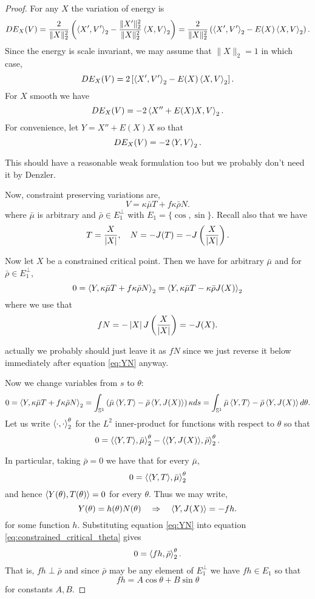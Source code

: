 \documentclass[12pt]{article}
\begin{document}
\begin{proof}
For any \(X\) the variation of energy is
\[
DE_X (V) = \frac{2}{\|X\|_2^2} \left(\left\langle{X'},{V'}\right\rangle_2 - \frac{\|X'\|_2^2}{\|X\|_2^2}\left\langle{X},{V}\right\rangle_2\right) = \frac{2}{\|X\|_2^2} \left(\left\langle{X'},{V'}\right\rangle_2 - E(X) \left\langle{X},{V}\right\rangle_2\right).
\]
Since the energy is scale invariant, we may assume that \(\|X\|_2 = 1\) in which case,
\[
DE_X (V) = 2\left[\left\langle{X'},{V'}\right\rangle_2 - E(X) \left\langle{X},{V}\right\rangle_2\right].
\]
For \(X\) smooth we have
\[
DE_X(V) = -2\left\langle{X'' + E(X) X},{V}\right\rangle_2.
\]
For convenience, let \(Y = X'' + E(X) X\) so that
\[
DE_X(V) = -2\left\langle{Y},{V}\right\rangle_2.
\]

{\color{red} This should have a reasonable weak formulation too but we probably don't need it by Denzler.}

Now, constraint preserving variations are,
\[
V = \kappa \bar{\mu} T + f\kappa\bar{\rho} N.
\]
where \(\bar{\mu}\) is arbitrary and \(\bar{\rho} \in E_1^{\perp}\) with \(E_1 = \{\cos,\sin\}\). Recall also that we have
\[
T = \frac{X}{\left|{X}\right|}, \quad N = -J(T) = -J\left(\frac{X}{\left|{X}\right|}\right).
\]

Now let \(X\) be a constrained critical point. Then we have for arbitrary \(\bar{\mu}\) and for \(\bar{\rho} \in E_1^{\perp}\),
\begin{equation}
\label{eq:constrained_critical}
0 = \left\langle{Y},{\kappa \bar{\mu} T + f\kappa\bar{\rho} N}\right\rangle_2 = \left\langle{Y},{\kappa \bar{\mu} T - \kappa\bar{\rho} J(X)}\right\rangle_2
\end{equation}
where we use that
\[
f N = -\left|{X}\right| J\left(\frac{X}{\left|{X}\right|}\right) = - J(X).
\]

{\color{red}actually we probably should just leave it as \(fN\) since we just reverse it below immediately after equation \eqref{eq:YN} anyway.}

Now we change variables from \(s\) to \(\theta\):
\[
0 = \left\langle{Y},{\kappa \bar{\mu} T + f\kappa\bar{\rho} N}\right\rangle_2 = \int_{\operatorname{\mathbb{S}^1}} \left(\bar{\mu} \left\langle{Y},{T}\right\rangle - \bar{\rho} \left\langle{Y},{J(X)}\right\rangle\right) \kappa ds = \int_{\operatorname{\mathbb{S}^1}} \bar{\mu} \left\langle{Y},{T}\right\rangle - \bar{\rho} \left\langle{Y},{J(X)}\right\rangle d\theta.
\]
Let us write \(\left\langle{\cdot},{\cdot}\right\rangle_2^{\theta}\) for the \(L^2\) inner-product for functions with respect to \(\theta\) so that
\begin{equation}
\label{eq:constrained_critical_theta}
0 = \left\langle{\ensuremath{\left\langle{Y},{T}\right\rangle}},{\bar{\mu}}\right\rangle_2^{\theta} - \left\langle{\ensuremath{\left\langle{Y},{J(X)}\right\rangle}},{\bar{\rho}}\right\rangle_2^{\theta}.
\end{equation}

In particular, taking \(\bar{\rho} = 0\) we have that for every \(\bar{\mu}\),
\[
0 = \left\langle{\ensuremath{\left\langle{Y},{T}\right\rangle}},{\bar{\mu}}\right\rangle_2^{\theta}
\]
and hence \(\left\langle{Y(\theta)},{T(\theta)}\right\rangle = 0\) for every \(\theta\). Thus we may write,
\begin{equation}
\label{eq:YN}
Y(\theta) = h(\theta) N(\theta) \quad \Rightarrow \quad \left\langle{Y},{J(X)}\right\rangle = -fh.
\end{equation}
for some function \(h\). Substituting equation \eqref{eq:YN} into equation \eqref{eq:constrained_critical_theta} gives
\[
0 = \left\langle{fh},{\bar{\rho}}\right\rangle_2^{\theta}.
\]
That is, \(fh \perp \bar{\rho}\) and since \(\bar{\rho}\) may be any element of \(E_1^{\perp}\) we have \(fh \in E_1\) so that
\[
fh = A \cos\theta + B \sin\theta
\]
for constants \(A, B\).


\end{proof}
\end{document}
